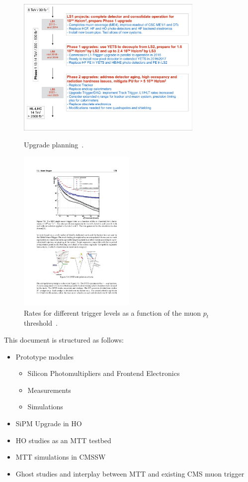 \begin{figure}[htbp]
\centering
\includegraphics[width=0.8\textwidth]{Figures/pooth/upgrade_planning.pdf}\\
\caption{Upgrade planning~\cite{schedule}.} 
\label{fig:upgrade_planning}
\end{figure}
\begin{figure}[htbp]
\centering
\includegraphics[width=0.5\textwidth]{Figures/pooth/pt_threshold.pdf}
\caption{Rates for different trigger levels as a function of the muon $p_t$ threshold~\cite{pt_threshold}.}
\label{fig:pt_threshold}
\end{figure}

This document is structured as follows:
\begin{itemize}
\item Prototype modules
	\begin{itemize}
	\item Silicon Photomultipliers and Frontend Electronics
	\item Measurements
	\item Simulations
	\end{itemize}
\item SiPM Upgrade in HO 
\item HO studies as an MTT testbed
\item MTT simulations in CMSSW
\item Ghost studies and interplay between MTT and existing CMS muon trigger
\end{itemize}